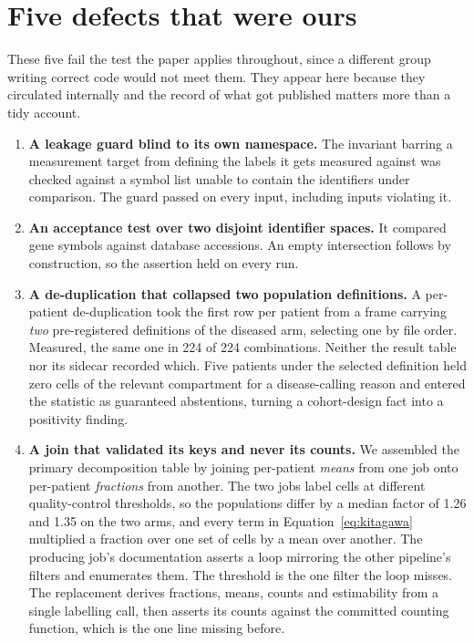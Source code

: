 \section{Five defects that were ours}
\label{app:ours}

These five fail the test the paper applies throughout, since a different group
writing correct code would not meet them. They appear here because they
circulated internally and the record of what got published matters more than a
tidy account.

\begin{enumerate}\itemsep3pt
\item \textbf{A leakage guard blind to its own namespace.} The invariant barring
a measurement target from defining the labels it gets measured against was
checked against a symbol list unable to contain the identifiers under
comparison. The guard passed on every input, including inputs violating it.

\item \textbf{An acceptance test over two disjoint identifier spaces.} It
compared gene symbols against database accessions. An empty intersection
follows by construction, so the assertion held on every run.

\item \textbf{A de-duplication that collapsed two population definitions.} A
per-patient de-duplication took the first row per patient from a frame carrying
\emph{two} pre-registered definitions of the diseased arm, selecting one by
file order. Measured, the same one in 224 of 224 combinations. Neither the
result table nor its sidecar recorded which. Five patients under the selected
definition held zero cells of the relevant compartment for a disease-calling
reason and entered the statistic as guaranteed abstentions, turning a
cohort-design fact into a positivity finding.

\item \textbf{A join that validated its keys and never its counts.} We assembled
the primary decomposition table by joining per-patient \emph{means} from one
job onto per-patient \emph{fractions} from another. The two jobs label cells at
different quality-control thresholds, so the populations differ by a median
factor of 1.26 and 1.35 on the two arms, and every term in
Equation~\ref{eq:kitagawa} multiplied a fraction over one set of cells by a
mean over another. The producing job's documentation asserts a loop mirroring
the other pipeline's filters and enumerates them. The threshold is the one
filter the loop misses. The replacement derives fractions, means, counts and
estimability from a single labelling call, then asserts its counts against the
committed counting function, which is the one line missing before.


\end{enumerate}
